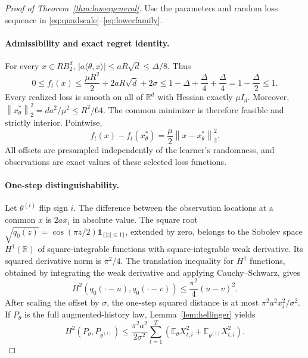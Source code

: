 \documentclass[11pt]{article}
\numberwithin{equation}{section}
\newcommand{\R}{\mathbb R}
\newcommand{\E}{\mathbb E}
\newcommand{\ip}[2]{\langle #1,#2\rangle}
\newcommand{\norm}[1]{\left\|#1\right\|}
\theoremstyle{definition}
\theoremstyle{remark}
\begin{document}
\begin{proof}[Proof of Theorem~\ref{thm:lowergeneral}]
Use the parameters and random loss sequence in
\eqref{eq:quadscale}--\eqref{eq:lowerfamily}.

\paragraph{Admissibility and exact regret identity.}
For every $x\in RB_2^d$, $|a\ip{\theta}x|\leq aR\sqrt d\leq\Delta/8$.
Thus
\[
 0\leq f_t(x)\leq\frac{\mu R^2}{2}+2aR\sqrt d+2\sigma
 \leq1-\Delta+\frac\Delta4+\frac\Delta4
 =1-\frac\Delta2\leq1.
\]
Every realized loss is smooth on all of $\R^d$ with Hessian exactly $\mu I_d$.
Moreover,
$\norm{x_\theta^*}_2^2=da^2/\mu^2\leq R^2/64$.
The common minimizer is therefore feasible and strictly interior. Pointwise,
\begin{equation}\label{eq:quadregret}
 f_t(x)-f_t(x_\theta^*)=\frac\mu2\norm{x-x_\theta^*}_2^2.
\end{equation}
All offsets are presampled independently of the learner's randomness, and
observations are exact values of these selected loss functions.

\paragraph{One-step distinguishability.}
Let $\theta^{(i)}$ flip sign $i$. The difference between the observation
locations at a common $x$ is $2a x_i$ in absolute value. The square root
$\sqrt{q_0(z)}=\cos(\pi z/2)\mathbf1_{\{|z|\leq1\}}$, extended by
zero, belongs to the Sobolev space $H^1(\R)$ of square-integrable functions
with square-integrable weak derivative. Its
squared derivative norm is $\pi^2/4$. The translation inequality for $H^1$
functions, obtained by integrating the weak derivative and applying
Cauchy--Schwarz, gives
\[
 H^2(q_0(\cdot-u),q_0(\cdot-v))\leq\frac{\pi^2}{4}(u-v)^2.
\]
After scaling the offset by $\sigma$, the one-step squared distance is at most
$\pi^2a^2x_i^2/\sigma^2$. If $P_\theta$ is the full augmented-history law,
Lemma~\ref{lem:hellinger} yields
\begin{equation}\label{eq:pairenergy}
 H^2(P_\theta,P_{\theta^{(i)}})
 \leq\frac{\pi^2a^2}{2\sigma^2}\sum_{t=1}^T
   \left(\E_\theta X_{t,i}^2+\E_{\theta^{(i)}}X_{t,i}^2\right).
\end{equation}


\end{proof}
\end{document}
